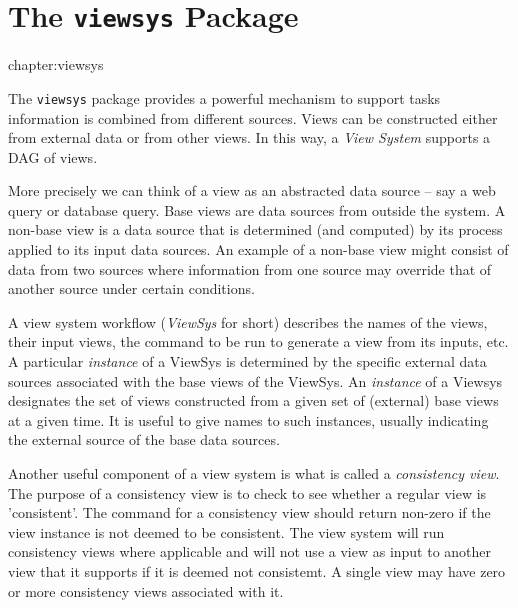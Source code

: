 

\chapter{The {\tt viewsys} Package}{chapter:viewsys}

The {\tt viewsys} package provides a powerful mechanism to support
tasks information is combined from different sources.  Views can be
constructed either from external data or from other views.  In this
way, a {\em View System} supports a DAG of views.


More precisely we can think of a view as an abstracted data source --
say a web query or database query.  Base views are data sources from
outside the system.  A non-base view is a data source that is
determined (and computed) by its process applied to its input data
sources.  An example of a non-base view might consist of data from two
sources where information from one source may override that of another
source under certain conditions.


A view system workflow ({\em ViewSys} for short) describes the names
of the views, their input views, the command to be run to generate a
view from its inputs, etc.  A particular {\em instance} of a ViewSys
is determined by the specific external data sources associated with
the base views of the ViewSys.  An {\em instance} of a Viewsys
designates the set of views constructed from a given set of (external)
base views at a given time.  It is useful to give names to such
instances, usually indicating the external source of the base data
sources.  

Another useful component of a view system is what is called a {\em
  consistency view}.  The purpose of a consistency view is to check to
see whether a regular view is 'consistent'.  The command for a
consistency view should return non-zero if the view instance is not
deemed to be consistent.
%
The view system will run consistency views where applicable and will
not use a view as input to another view that it supports if it is
deemed not consistemt.  A single view may have zero or more
consistency views associated with it.

